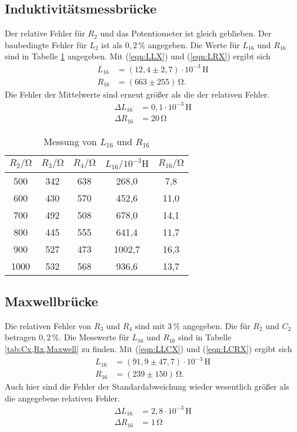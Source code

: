 \subsection{Induktivitätsmessbrücke}
Der relative Fehler für $R_2$ und das Potentiometer ist gleich geblieben. Der baubedingte Fehler für $L_2$ ist als $0,2\,\%$ angegeben.
Die Werte für $L_{16}$ und $R_{16}$ sind in Tabelle \ref{tab:Cx,Rx} angegeben. Mit (\ref{eqn:LLX}) und (\ref{eqn:LRX}) ergibt sich
\begin{align*}
  L_{16} &= (12,4 \pm 2,7)\cdot 10^{-3} \,\unit{\henry} \\
  R_{16} &= (663 \pm 255)\,\unit{\ohm}.
\end{align*}
Die Fehler der Mittelwerte sind erneut größer als die der relativen Fehler.
\begin{align*}
  \Delta L_{16} &= 0,1\cdot 10^{-3}\,\unit{\henry} \\
  \Delta R_{16} &= 20\,\unit{\ohm}
\end{align*}

\begin{table}
  \centering
  \caption{Messung von $L_{16}$ und $R_{16}$}
  \label{tab:Cx,Rx}
  \begin{tabular}{c c c c c}
    \toprule
    $R_2/\unit{\ohm}$ & $R_3/\unit{\ohm}$ & $R_4/\unit{\ohm}$ & $L_{16}/10^{-3}\unit{\henry}$ & $R_{16}/\unit{\ohm}$ \\
    \midrule
     500 & 342 & 638 &  268,0 &  7,8 \\
     600 & 430 & 570 &  452,6 & 11,0 \\
     700 & 492 & 508 &  678,0 & 14,1 \\
     800 & 445 & 555 &  641,4 & 11,7 \\
     900 & 527 & 473 & 1002,7 & 16,3 \\
    1000 & 532 & 568 &  936,6 & 13,7 \\
    \bottomrule
  \end{tabular}
\end{table}

\subsection{Maxwellbrücke}
Die relativen Fehler von $R_3$ und $R_4$ sind mit $3\,\% $ angegeben. Die für $R_2$ und $C_2$ betragen $0,2\,\%$.
Die Messwerte für $L_{16}$ und $R_{16}$ sind in Tabelle \ref{tab:Cx,Rx,Maxwell} zu finden. Mit (\ref{eqn:LLCX}) und (\ref{eqn:LCRX}) ergibt sich
\begin{align*}
  L_{16} &= (91,9 \pm 47,7)\cdot 10^{-3} \,\unit{\henry} \\
  R_{16} &= (239 \pm 150)\,\unit{\ohm}.
\end{align*}
Auch hier sind die Fehler der Standardabweichung wieder wesentlich größer als die angegebene relativen Fehler.
\begin{align*}
  \Delta L_{16} &= 2,8\cdot 10^{-3}\,\unit{\henry} \\
  \Delta R_{16} &= 1\,\unit{\ohm}
\end{align*}

